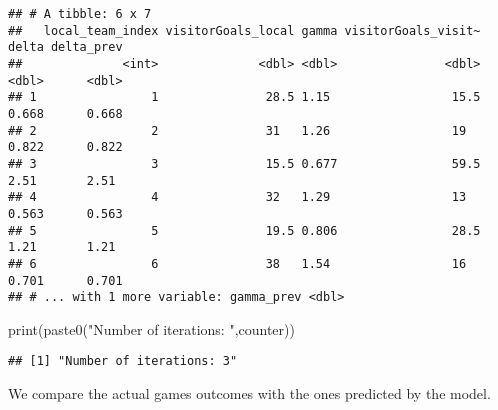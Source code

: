 \documentclass[
]{article}
\newenvironment{Shaded}{\begin{snugshade}}{\end{snugshade}}
\newcommand{\FunctionTok}[1]{\textcolor[rgb]{0.00,0.00,0.00}{#1}}
\newcommand{\NormalTok}[1]{#1}
\newcommand{\StringTok}[1]{\textcolor[rgb]{0.31,0.60,0.02}{#1}}
\begin{document}
\begin{verbatim}
## # A tibble: 6 x 7
##   local_team_index visitorGoals_local gamma visitorGoals_visit~ delta delta_prev
##              <int>              <dbl> <dbl>               <dbl> <dbl>      <dbl>
## 1                1               28.5 1.15                 15.5 0.668      0.668
## 2                2               31   1.26                 19   0.822      0.822
## 3                3               15.5 0.677                59.5 2.51       2.51 
## 4                4               32   1.29                 13   0.563      0.563
## 5                5               19.5 0.806                28.5 1.21       1.21 
## 6                6               38   1.54                 16   0.701      0.701
## # ... with 1 more variable: gamma_prev <dbl>
\end{verbatim}

\begin{Shaded}
\begin{Highlighting}[]
\FunctionTok{print}\NormalTok{(}\FunctionTok{paste0}\NormalTok{(}\StringTok{"Number of iterations: "}\NormalTok{,counter))}
\end{Highlighting}
\end{Shaded}

\begin{verbatim}
## [1] "Number of iterations: 3"
\end{verbatim}

We compare the actual games outcomes with the ones predicted by the
model.
\end{document}
